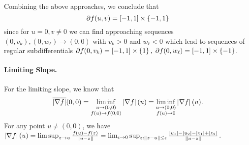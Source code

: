 \documentclass[10pt]{article}
\begin{document}
Combining the above approaches, we conclude that
\[
    \partial f(u, v) = [-1, 1] \times \left\{ -1, 1 \right\}
\]
since for $u = 0, v \neq 0$ we can find approaching sequences $(0, v_k), (0,
w_{\ell}) \to (0, 0)$ with $v_k > 0$ and $w_{\ell} < 0$ which lead to sequences
of regular subdifferentials $\partial f(0, v_k) = [-1, 1] \times \left\{ 1 \right\}, \;
\partial f(0, w_{\ell}) = [-1, 1] \times \left\{ -1 \right\}$.


\paragraph{Limiting Slope.}
For the limiting slope, we know that
\[
    \overline{\left| \nabla f \right|}(0, 0) = \liminf_{\substack{u \to (0, 0) \\ f(u)
    \to f(0, 0)}} \left| \nabla f \right|(u) = \liminf_{\substack{u \to (0, 0) \\ f(u)
    \to 0}} \left| \nabla f \right|(u).
\]
For any point $u \neq (0, 0)$, we have $\left| \nabla f \right|(u) =
\limsup_{z \to u} \frac{f(u) - f(z)}{\left \| u - z \right \|} = \lim_{\epsilon \to 0}
\sup_{z : \left \| z - u \right \| \leq \epsilon}
\frac{\left| u_1 \right| - \left| u_2 \right| - \left| z_1 \right| + \left| z_2 \right|}{\left \| u - z \right \|}$.
\end{document}
